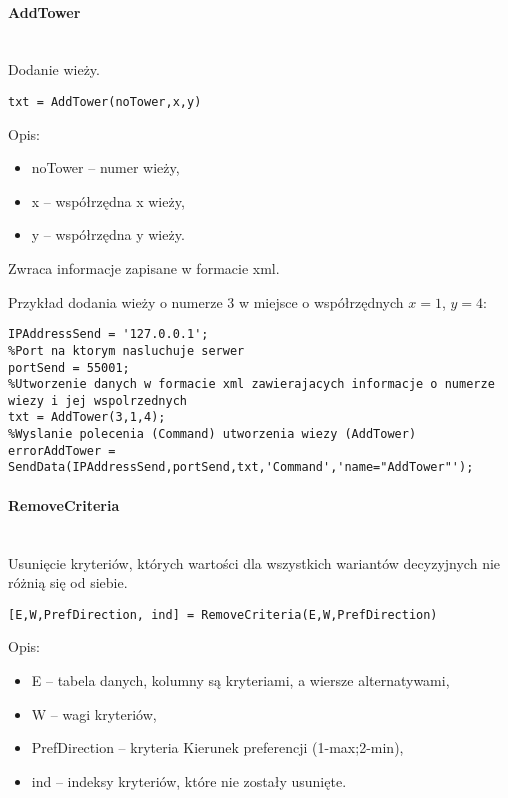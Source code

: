 \paragraph{AddTower} \hspace{0pt} \\

Dodanie wieży.
\begin{lstlisting}[style=Matlab-editor]
txt = AddTower(noTower,x,y)
\end{lstlisting}

Opis:
\begin{itemize}
\item noTower -- numer wieży,
\item x -- współrzędna x wieży,
\item y -- współrzędna y wieży.
\end{itemize}

Zwraca informacje zapisane w formacie xml.

Przykład dodania wieży o numerze 3 w miejsce o współrzędnych $x=1$, $y = 4$: 
\begin{lstlisting}[style=Matlab-editor]
%Adres serwera
IPAddressSend = '127.0.0.1';
%Port na ktorym nasluchuje serwer
portSend = 55001;
%Utworzenie danych w formacie xml zawierajacych informacje o numerze wiezy i jej wspolrzednych
txt = AddTower(3,1,4);
%Wyslanie polecenia (Command) utworzenia wiezy (AddTower)
errorAddTower = SendData(IPAddressSend,portSend,txt,'Command','name="AddTower"');
\end{lstlisting}

\paragraph{RemoveCriteria} \hspace{0pt} \\
Usunięcie kryteriów, których wartości dla wszystkich wariantów decyzyjnych nie różnią się od siebie.

\begin{lstlisting}[style=Matlab-editor]
[E,W,PrefDirection, ind] = RemoveCriteria(E,W,PrefDirection)
\end{lstlisting}

Opis:
\begin{itemize}
\item E -- tabela danych, kolumny są kryteriami, a wiersze alternatywami,
\item W -- wagi kryteriów,
\item PrefDirection -- kryteria Kierunek preferencji (1-max;2-min),
\item ind -- indeksy kryteriów, które nie zostały usunięte.
\end{itemize}

